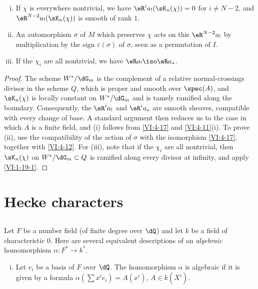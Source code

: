 \begin{proposition_}\label{VI:4-20}
\begin{enumerate}[(i)]
  \item If $\chi$ is everywhere nontrivial, we have 
    $\eR^i a_! (\sK_n(\chi)) = 0$ for $i\ne N-2$, and 
    $\eR^{N-2} a_!(\sK_n(\chi))$ is smooth of rank $1$. 
  \item An automorphism $\sigma$ of $M$ which preserves $\chi$ acts on this 
    $\eR^{N-2} a_!$ by multiplication by the sign $\varepsilon(\sigma)$ 
    of $\sigma$, seen as a permutation of $I$. 
  \item If the $\chi_i$ are all nontrivial, we have $\eR a_! \iso \eR a_\ast$. 
\end{enumerate}
\end{proposition_}
\begin{proof}[Proof]
The scheme $W^\ast/\dG_m$ is the complement of a relative normal-crossings 
divisor in the scheme $Q$, which is proper and smooth over $\spec(A)$, and 
$\sK_n(\chi)$ is 
locally constant on $W^\ast/\dG_m$ and is tamely ramified 
along the boundary. Consequently, the $\eR^i a_!$ and 
$\eR^i a_\ast$ are smooth sheaves, compatible with every change of 
base. A standard argument then reduces us to the case in which $A$ is a 
finite field, and (i) follows from \ref{VI:4-17} and \ref{VI:4-11}(i). 
To prove (ii), use the compatibility of the action of $\sigma$ with 
the isomorphism \ref{VI:4-17}, together with \ref{VI:4-12}. For (iii), note that if the 
$\chi_i$ are all nontrivial, then $\sK_n(\chi)$ on 
$W^\ast/\dG_m\subset Q$ is ramified along every divisor at infinity, 
and apply \ref{VI:1-19-1}. 
\end{proof}










\section{Hecke characters}\label{VI:5}





\subsection{}\label{VI:5-1}

Let $F$ be a number field (of finite degree over $\dQ$) and let $k$ be a field of 
characteristic $0$. Here are several equivalent descriptions of an 
\emph{algebraic} homomorphism $\alpha:F^\ast \to k^\ast$. 
\begin{enumerate}[(i)]
  \item Let $e_i$ be a basis of $F$ over $\dQ$. The homomorphism $\alpha$ is 
    algebraic if it is given by a formula 
    $\alpha(\sum x^i e_i) = A(x^i)$, $A\in k(X^i)$. 
\end{enumerate}

